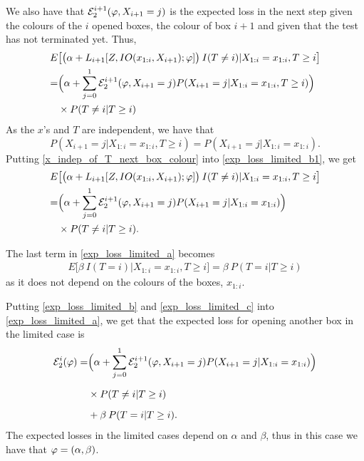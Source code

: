 We also have that $\mathcal{E}^{i+1}_{2}(\varphi,X_{i+1}=j)$ is the expected loss in the next step given the colours of the $i$ opened boxes,  the colour of box $i+1$ and given that the test has not terminated yet. Thus,
\begin{equation}
\label{exp_loss_limited_b1}
    \begin{aligned}
        E&\big[\big( \alpha + L_{i+1}[Z,IO(x_{1:i},X_{i+1});\varphi] \big) \: I(T\neq i) |X_{1:i}= x_{1:i}, T\geq i \big] \\
        =& \Big( \alpha + \sum_{j=0}^1 \mathcal{E}^{i+1}_{2}(\varphi,X_{i+1}=j) P(X_{i+1}=j|X_{1:i}=x_{1:i},T\geq i) \Big)\\
        &\times P(T \neq i|T\geq i)
    \end{aligned}
\end{equation}
As the $x$'s and $T$ are independent, we have that
\begin{equation}
\label{x_indep_of_T_next_box_colour}
    P(X_{i+1}=j|X_{1:i}=x_{1:i},T\geq i) = P(X_{i+1}=j|X_{1:i}=x_{1:i}).
\end{equation}
Putting \eqref{x_indep_of_T_next_box_colour} into \eqref{exp_loss_limited_b1}, we get
\begin{equation}
\label{exp_loss_limited_b}
    \begin{aligned}
        E&\big[\big( \alpha + L_{i+1}[Z,IO(x_{1:i},X_{i+1});\varphi] \big) \: I(T\neq i) |X_{1:i}= x_{1:i}, T\geq i \big] \\
        =& \Big( \alpha + \sum_{j=0}^1 \mathcal{E}^{i+1}_{2}(\varphi,X_{i+1}=j) P(X_{i+1}=j|X_{1:i}=x_{1:i}) \Big)\\
        &\times P(T \neq i|T\geq i).
    \end{aligned}
\end{equation}

The last term in \eqref{exp_loss_limited_a} becomes
\begin{equation}
\label{exp_loss_limited_c}
    \begin{aligned}
        E\big[ \beta \: I(T=i)|X_{1:i}=x_{1:i}, T\geq i\big] 
        = \beta \: P(T=i|T\geq i)
    \end{aligned}
\end{equation}
as it does not depend on the colours of the boxes, $x_{1:i}$.

Putting \eqref{exp_loss_limited_b} and \eqref{exp_loss_limited_c} into \eqref{exp_loss_limited_a}, we get that the expected loss for opening another box in the limited case is
\begin{equation}
\label{exp_loss_limited_final}
    \begin{aligned}
        \mathcal{E}^i_{2}(\varphi) 
        =& \Big( \alpha + \sum_{j=0}^1 \mathcal{E}^{i+1}_{2}(\varphi,X_{i+1}=j) P(X_{i+1}=j|X_{1:i}=x_{1:i}) \Big) \\[6pt]
        &\times 
        P(T \neq i|T\geq i)\\[6pt]
        &+ \beta \: P(T=i|T\geq i).
    \end{aligned}
\end{equation}
The expected losses in the limited cases depend on $\alpha$ and $\beta$, thus in this case we have that $\varphi = (\alpha,\beta)$.

